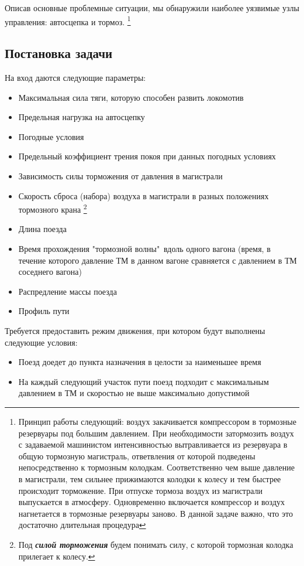 Описав основные проблемные ситуации, мы обнаружили наиболее уязвимые узлы управления: автосцепка и тормоз.
\footnote{ Принцип работы следующий: воздух закачивается компрессором в тормозные резервуары под большим давлением. При необходимости затормозить воздух с задаваемой машинистом интенсивностью вытравливается из резервуара в общую тормозную магистраль, ответвления от которой подведены непосредственно к тормозным колодкам. Соответственно чем выше давление в магистрали, тем сильнее прижимаются колодки к колесу и тем быстрее происходит торможение. При отпуске тормоза воздух из магистрали выпускается в атмосферу. Одновременно включается компрессор и воздух нагнетается в тормозные резервуары заново. В данной задаче важно, что это достаточно длительная процедура}

\subsection{Постановка задачи}
На вход даются следующие параметры:
\begin{itemize}
\item Максимальная сила тяги, которую способен развить локомотив
\item Предельная нагрузка на автосцепку
\item Погодные условия
\item Предельный коэффициент трения покоя при данных погодных условиях
\item Зависимость силы торможения от давления в магистрали
\item Скорость сброса (набора) воздуха в магистрали в разных положениях тормозного крана
\footnote{Под \textbf{\textit{силой торможения}} будем понимать силу, с которой тормозная колодка прилегает к колесу.}
\item Длина поезда
\item Время прохождения "тормозной волны"\ вдоль одного вагона (время, в течение которого давление ТМ в данном вагоне сравняется с давлением в ТМ соседнего вагона)
\item Распредление массы поезда
\item Профиль пути
\end{itemize}

Требуется предоставить режим движения, при котором будут выполнены следующие условия:
\begin{itemize}
\item Поезд доедет до пункта назначения в целости за наименьшее время
\item На каждый следующий участок пути поезд подходит с максимальным давлением в ТМ и скоростью не выше максимально допустимой
\end{itemize}


